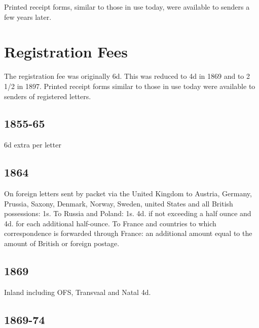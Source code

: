  
Printed receipt forms, similar to those in use today, were available 
to senders a few years later.

 
\section{Registration Fees}


The registration fee was originally 6d. This was reduced to 4d in 1869 and to 
2 1/2 in 1897. Printed receipt forms similar to those in use today 
were available to senders of registered letters. 

\subsection{1855-65}

6d extra per letter

\subsection{1864}

On foreign letters sent by packet via the United Kingdom to Austria, Germany, Prussia, Saxony, Denmark, Norway, Sweden, united States and all British possessions: 1s. To Russia and Poland: 1s. 4d. if not exceeding a half ounce and 4d. for each additional half-ounce. To France and countries to which correspondence is forwarded through France: an additional amount equal to the amount of British or foreign postage.

\subsection{1869}

Inland including OFS, Transvaal and Natal 4d.

\subsection{1869-74}

